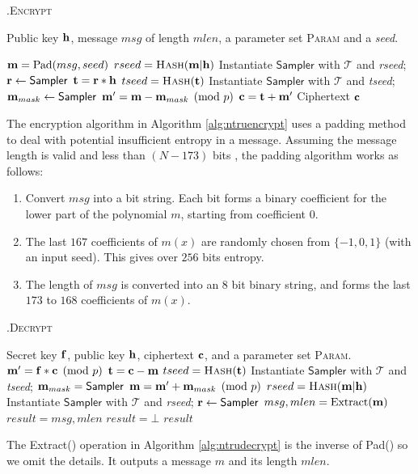 \documentclass{llncs}
\newcommand{\bfc}{{\bf c}}
\newcommand{\bff}{{\bf f}}
\newcommand{\bfh}{{\bf h}}
\newcommand{\bfm}{{\bf m}}
\newcommand{\bfr}{{\bf r}}
\newcommand{\bft}{{\bf t}}
\newcommand{\ntrupke}{{\sf{ntru-pke}}}
\newcommand{\encrypt}{{\textsc{Encrypt}}}
\newcommand{\decrypt}{{\textsc{Decrypt}}}
\newcommand{\hash}{{\textsc{Hash}}}
\newcommand{\<}{\langle}
\renewcommand{\>}{\rangle}
\begin{document}
\begin{algorithm}[H]
\caption{\ntrupke.\encrypt}
\begin{algorithmic}[1]
\label{alg:ntruencrypt}
\REQUIRE Public key $\bfh$, message $msg$ of length $mlen$, a parameter set \textsc{Param} and a {\em seed}.

\STATE $\bfm = \text{Pad}(msg, seed)$
\STATE $rseed = \hash(\bfm|\bfh)$
\STATE Instantiate $\textsf{Sampler}$ with $\mathcal{T}$ and {\em rseed};
  \STATE $\bfr \gets \textsf{Sampler}$  
  \STATE $\bft = \bfr*\bfh$
    \STATE $tseed = \hash(\bft)$
   \STATE Instantiate $\textsf{Sampler}$ with $\mathcal{T}$ and {\em tseed}; 
  \STATE $\bfm_{mask} \gets \textsf{Sampler}$
  \STATE $\bfm' = \bfm - \bfm_{mask} \pmod{p}$
  \STATE $\bfc = \bft + \bfm'$
\ENSURE Ciphertext $\bfc$
\end{algorithmic}
\end{algorithm}

The encryption algorithm in Algorithm \ref{alg:ntruencrypt} uses a padding method to deal with potential
insufficient entropy in a message.
Assuming the message length is valid and less than
$(N-173)$ bits
, the padding algorithm works as follows:
\begin{enumerate}


\item Convert $msg$ into a bit string. Each bit forms a binary coefficient for the lower part of the polynomial $m$, starting from coefficient $0$.
\item The last $167$ coefficients of $m(x)$ are 
randomly chosen from $\{-1,0,1\}$ (with an input seed). This gives over 
$256$ bits entropy.
\item The length of $msg$ is converted into an $8$ bit binary string, and forms the last $173$ to $168$ coefficients of $m(x)$.    
\end{enumerate}


\begin{algorithm}
\caption{\ntrupke.\decrypt}
\begin{algorithmic}[1]
\label{alg:ntrudecrypt}
\REQUIRE Secret key $\bff$, public key $\bfh$, ciphertext $\bfc$, and a parameter set \textsc{Param}.
  \STATE $\bfm' = \bff*\bfc \pmod{p}$
  \STATE $\bft = \bfc - \bfm$
 \STATE $tseed = \hash(\bft)$
   \STATE Instantiate $\textsf{Sampler}$ with $\mathcal{T}$ and {\em tseed}; 
  \STATE $\bfm_{mask} = \textsf{Sampler}$
  \STATE $\bfm  = \bfm' + \bfm_{mask} \pmod{p}$
\STATE $rseed = \hash(\bfm|\bfh)$
\STATE Instantiate $\textsf{Sampler}$ with $\mathcal{T}$ and {\em rseed};
  \STATE $\bfr \gets \textsf{Sampler}$  
  \STATE $msg, mlen = \text{Extract}(\bfm)$
  \IF{$p\cdot \bfr*\bfh = \bft$}
  \STATE $result = msg, mlen$
  \ELSE
  \STATE $result = \bot$
  \ENDIF
  \ENSURE $result$
\end{algorithmic}
\end{algorithm}
The Extract() operation in Algorithm \ref{alg:ntrudecrypt}  is the inverse of Pad() so we omit the details. It
outputs a message $m$ and its length $mlen$.
\end{document}
